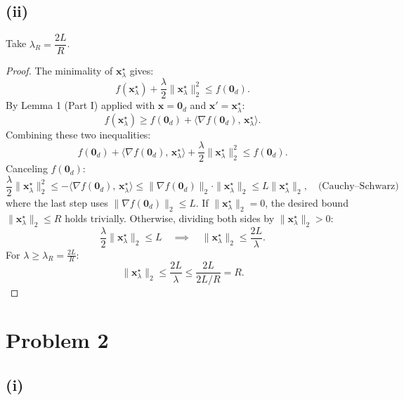 \documentclass[12pt]{article}
\begin{document}
\subsection*{(ii)}

Take $\lambda_R = \dfrac{2L}{R}$.

\begin{proof}
The minimality of $\mathbf{x}_\lambda^\star$ gives:
\[
f(\mathbf{x}_\lambda^\star) + \frac{\lambda}{2}\|\mathbf{x}_\lambda^\star\|_2^2 \leq f(\mathbf{0}_d).
\]
By Lemma 1 (Part I) applied with $\mathbf{x} = \mathbf{0}_d$ and $\mathbf{x}' = \mathbf{x}_\lambda^\star$:
\[
f(\mathbf{x}_\lambda^\star) \geq f(\mathbf{0}_d) + \langle \nabla f(\mathbf{0}_d),\, \mathbf{x}_\lambda^\star \rangle.
\]
Combining these two inequalities:
\[
f(\mathbf{0}_d) + \langle \nabla f(\mathbf{0}_d),\, \mathbf{x}_\lambda^\star \rangle + \frac{\lambda}{2}\|\mathbf{x}_\lambda^\star\|_2^2 \leq f(\mathbf{0}_d).
\]
Canceling $f(\mathbf{0}_d)$:
\[
\frac{\lambda}{2}\|\mathbf{x}_\lambda^\star\|_2^2 \leq -\langle \nabla f(\mathbf{0}_d),\, \mathbf{x}_\lambda^\star \rangle \leq \|\nabla f(\mathbf{0}_d)\|_2 \cdot \|\mathbf{x}_\lambda^\star\|_2 \leq L\|\mathbf{x}_\lambda^\star\|_2, \quad \text{(Cauchy--Schwarz)}
\]
where the last step uses $\|\nabla f(\mathbf{0}_d)\|_2 \leq L$. If $\|\mathbf{x}_\lambda^\star\|_2 = 0$, the desired bound $\|\mathbf{x}_\lambda^\star\|_2 \leq R$ holds trivially. Otherwise, dividing both sides by $\|\mathbf{x}_\lambda^\star\|_2 > 0$:
\[
\frac{\lambda}{2}\|\mathbf{x}_\lambda^\star\|_2 \leq L \quad \implies \quad \|\mathbf{x}_\lambda^\star\|_2 \leq \frac{2L}{\lambda}.
\]
For $\lambda \geq \lambda_R = \frac{2L}{R}$:
\[
\|\mathbf{x}_\lambda^\star\|_2 \leq \frac{2L}{\lambda} \leq \frac{2L}{2L/R} = R.
\]
\end{proof}

\section*{Problem 2}

\subsection*{(i)}
\end{document}
